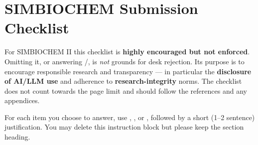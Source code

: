 \section*{SIMBIOCHEM Submission Checklist}

For SIMBIOCHEM II this checklist is \textbf{highly encouraged but not enforced}. Omitting it, or answering \answerNo{}/\answerNA{}, is \emph{not} grounds for desk rejection. Its purpose is to encourage responsible research and transparency --- in particular the \textbf{disclosure of AI/LLM use} and adherence to \textbf{research-integrity} norms. The checklist does not count towards the page limit and should follow the references and any appendices.

For each item you choose to answer, use \answerYes{}, \answerNo{}, or \answerNA{}, followed by a short (1--2 sentence) justification. You may delete this instruction block but please keep the section heading.


